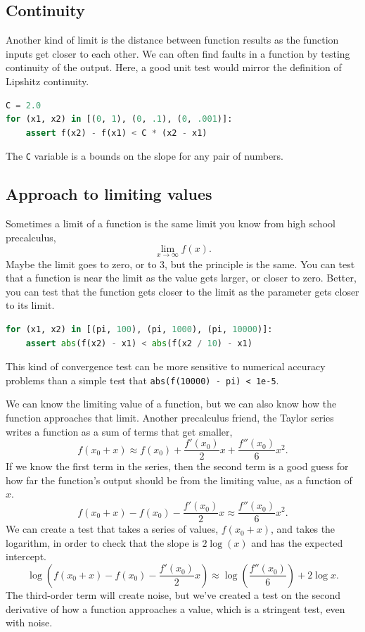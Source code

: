 \documentclass[fleqn,10pt]{olplainarticle}
\begin{document}
\subsection{Continuity}

Another kind of limit is the distance between function results
as the function inputs get closer to each other. We can often
find faults in a function by testing continuity of the output.
Here, a good unit test would mirror the definition of Lipshitz continuity.
\begin{lstlisting}[language=python]
C = 2.0
for (x1, x2) in [(0, 1), (0, .1), (0, .001)]:
    assert f(x2) - f(x1) < C * (x2 - x1)
\end{lstlisting}
The \lstinline!C! variable is a bounds on the slope for any
pair of numbers.

\subsection{Approach to limiting values}

Sometimes a limit of a function is the same limit you know
from high school precalculus,
\begin{equation}
  \lim_{x\rightarrow\infty} f(x).
\end{equation}
Maybe the limit goes to zero, or to 3, but the principle is
the same. You can test that a function is near the limit
as the value gets larger, or closer to zero. Better, you can
test that the function gets closer to the limit as the
parameter gets closer to its limit.
\begin{lstlisting}[language=python]
for (x1, x2) in [(pi, 100), (pi, 1000), (pi, 10000)]:
    assert abs(f(x2) - x1) < abs(f(x2 / 10) - x1)
\end{lstlisting}
This kind of convergence test can be more sensitive to
numerical accuracy problems than a simple test
that \lstinline|abs(f(10000) - pi) < 1e-5|.

We can know the limiting value of a
function, but we can also know how the function approaches
that limit. Another precalculus friend, the Taylor series
writes a function as a sum of terms that get smaller,
\begin{equation}
  f(x_0+x) \approx f(x_0) + \frac{f'(x_0)}{2}x + \frac{f''(x_0)}{6}x^2.
\end{equation}
If we know the first term in the series, then the second term
is a good guess for how far the function's output should be from
the limiting value, as a function of $x$.
\begin{equation}
  f(x_0+x)  - f(x_0) - \frac{f'(x_0)}{2}x \approx \frac{f''(x_0)}{6}x^2.
\end{equation}
We can create a test that takes a series of values,
$f(x_0+x)$, and takes the logarithm, in order to check that
the slope is $2\log(x)$ and has the expected intercept.
\begin{equation}
  \log\left(f(x_0+x)  - f(x_0) - \frac{f'(x_0)}{2}x\right) \approx \log\left(\frac{f''(x_0)}{6}\right) + 2\log x.
\end{equation}
The third-order term will create noise, but we've created a
test on the second derivative of how a function approaches a
value, which is a stringent test, even with noise.
\end{document}
